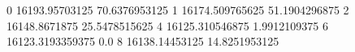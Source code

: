 0 16193.95703125 70.6376953125
1 16174.509765625 51.1904296875
2 16148.8671875 25.5478515625
4 16125.310546875 1.9912109375
6 16123.3193359375 0.0
8 16138.14453125 14.8251953125
